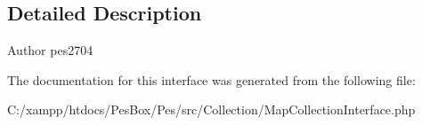 \subsection{Detailed Description}
\begin{DoxyAuthor}{Author}
pes2704 
\end{DoxyAuthor}


The documentation for this interface was generated from the following file\+:\begin{DoxyCompactItemize}
\item 
C\+:/xampp/htdocs/\+Pes\+Box/\+Pes/src/\+Collection/Map\+Collection\+Interface.\+php\end{DoxyCompactItemize}
